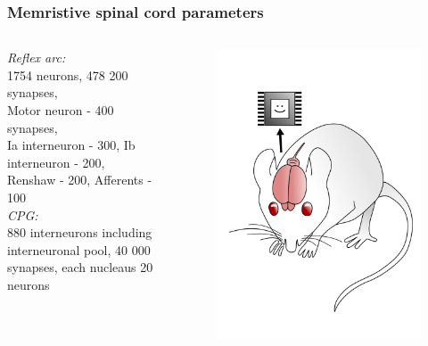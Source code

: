 \documentclass[12pt, aspectratio=169]{beamer}
\begin{document}

\begin{frame}
  \frametitle{Memristive spinal cord parameters}
\begin{columns}[c]

\emph{Reflex arc:}\\
1754 neurons, 478 200 synapses,\\
Motor neuron - 400 synapses,\\
Ia interneuron - 300,
Ib interneuron - 200,\\
Renshaw - 200,
Afferents - 100\\


\emph{CPG:}\\
880 interneurons including interneuronal pool,
40 000 synapses,
each nucleaus 20 neurons

\begin{figure}
\includegraphics[width=1.0\linewidth]{mousebrainpink}
\end{figure}
\end{columns}
\end{frame}

\end{document}
